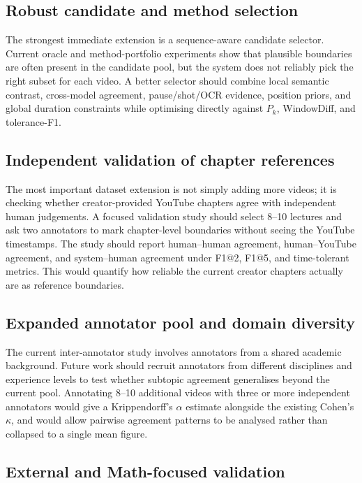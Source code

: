 \subsection{Robust candidate and method selection}

The strongest immediate extension is a sequence-aware candidate selector.
Current oracle and method-portfolio experiments show that plausible boundaries
are often present in the candidate pool, but the system does not reliably pick
the right subset for each video. A better selector should combine local
semantic contrast, cross-model agreement, pause/shot/OCR evidence, position
priors, and global duration constraints while optimising directly against
$P_k$, WindowDiff, and tolerance-F1.

\subsection{Independent validation of chapter references}

The most important dataset extension is not simply adding more videos; it is
checking whether creator-provided YouTube chapters agree with independent
human judgements. A focused validation study should select 8--10 lectures and
ask two annotators to mark chapter-level boundaries without seeing the YouTube
timestamps. The study should report human--human agreement, human--YouTube
agreement, and system--human agreement under F1@2, F1@5, and time-tolerant
metrics. This would quantify how reliable the current creator chapters actually
are as reference boundaries.

\subsection{Expanded annotator pool and domain diversity}

The current inter-annotator study involves annotators from a shared academic
background. Future work should recruit annotators from different disciplines
and experience levels to test whether subtopic agreement generalises beyond
the current pool. Annotating 8--10 additional videos with three or more
independent annotators would give a Krippendorff's $\alpha$ estimate alongside
the existing Cohen's $\kappa$, and would allow pairwise agreement patterns to
be analysed rather than collapsed to a single mean figure.

\subsection{External and Math-focused validation}

